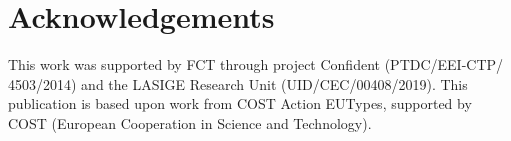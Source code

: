 \section*{Acknowledgements}
This work was supported by FCT through project Confident
  (PTDC/EEI-CTP/ 4503/2014) and the LASIGE Research Unit
  (UID/CEC/00408/2019). This publication is based upon 
  work from COST Action EUTypes, 
  supported by COST (European Cooperation in Science and 
  Technology).